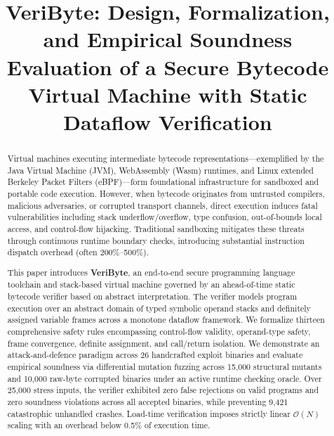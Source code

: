\documentclass[conference]{IEEEtran}
\begin{document}
\title{VeriByte: Design, Formalization, and Empirical Soundness Evaluation of a Secure Bytecode Virtual Machine with Static Dataflow Verification}

\author{
\and
{}
}

\maketitle

\begin{abstract}
Virtual machines executing intermediate bytecode representations---exemplified by the Java Virtual Machine (JVM), WebAssembly (Wasm) runtimes, and Linux extended Berkeley Packet Filters (eBPF)---form foundational infrastructure for sandboxed and portable code execution. However, when bytecode originates from untrusted compilers, malicious adversaries, or corrupted transport channels, direct execution induces fatal vulnerabilities including stack underflow/overflow, type confusion, out-of-bounds local access, and control-flow hijacking. Traditional sandboxing mitigates these threats through continuous runtime boundary checks, introducing substantial instruction dispatch overhead (often 200\%--500\%). 

This paper introduces \textbf{VeriByte}, an end-to-end secure programming language toolchain and stack-based virtual machine governed by an ahead-of-time static bytecode verifier based on abstract interpretation. The verifier models program execution over an abstract domain of typed symbolic operand stacks and definitely assigned variable frames across a monotone dataflow framework. We formalize thirteen comprehensive safety rules encompassing control-flow validity, operand-type safety, frame convergence, definite assignment, and call/return isolation. We demonstrate an attack-and-defence paradigm across 26 handcrafted exploit binaries and evaluate empirical soundness via differential mutation fuzzing across 15,000 structural mutants and 10,000 raw-byte corrupted binaries under an active runtime checking oracle. Over 25,000 stress inputs, the verifier exhibited zero false rejections on valid programs and zero soundness violations across all accepted binaries, while preventing 9,421 catastrophic unhandled crashes. Load-time verification imposes strictly linear $\mathcal{O}(N)$ scaling with an overhead below 0.5\% of execution time.
\end{abstract}
\end{document}
